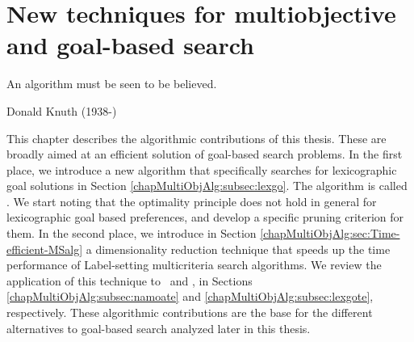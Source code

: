 %
%
%
%
%
%

\chapter{New techniques for multiobjective and goal-based search}
\label{chapContributions}


\begin{FraseCelebre}
\begin{Frase}
An algorithm must be seen to be believed.
\end{Frase}
\begin{Fuente}
Donald Knuth (1938-)
\end{Fuente}
\end{FraseCelebre}

This chapter describes the algorithmic contributions of this thesis.
These are broadly aimed at an efficient solution of goal-based search problems. 
In the first place, we introduce a new algorithm that specifically searches for lexicographic goal solutions in Section \ref{chapMultiObjAlg:subsec:lexgo}. The algorithm is called \lexgo. We start noting that the optimality principle does not hold in general for lexicographic goal based preferences, and develop a specific pruning criterion for them. In the second place, we introduce in Section \ref{chapMultiObjAlg:sec:Time-efficient-MSalg} a dimensionality reduction technique that speeds up the time performance of Label-setting multicriteria search algorithms. We review the application of this technique to \namoa \ and \lexgo, in Sections \ref{chapMultiObjAlg:subsec:namoate} and \ref{chapMultiObjAlg:subsec:lexgote}, respectively. These algorithmic contributions are the base for the different alternatives to goal-based search analyzed later in this thesis.

